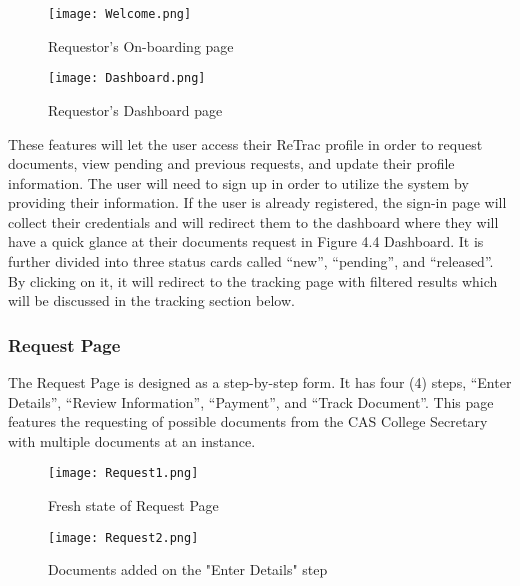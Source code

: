     \begin{figure}[h]
        \centering 
        \begin{minipage}[c]{0.5\linewidth}
            \centering
            \texttt{[image: Welcome.png]}
            \caption{Requestor's On-boarding page}
            \label{fig:Welcome}
        \end{minipage}\hfill
        \begin{minipage}[c]{0.5\linewidth}
            \centering
            \texttt{[image: Dashboard.png]}
            \caption{Requestor's Dashboard page}
            \label{fig:Dashboard}
        \end{minipage}
    \end{figure}


These features will let the user access their ReTrac profile in order to request documents, view pending and previous requests, and update their profile information. The user will need to sign up in order to utilize the system by providing their information. If the user is already registered, the sign-in page will collect their credentials and will redirect them to the dashboard where they will have a quick glance at their documents request in Figure 4.4 Dashboard. It is further divided into three status cards called “new”, “pending”, and “released”. By clicking on it, it will redirect to the tracking page with filtered results which will be discussed in the tracking section below.

\subsubsection{Request Page}

The Request Page is designed as a step-by-step form. It has four (4) steps, “Enter Details”, “Review Information”, “Payment”, and “Track Document”. This page features the requesting of possible documents from the CAS College Secretary with multiple documents at an instance.

    \begin{figure}[h]
        \centering 
        \begin{minipage}[c]{0.5\linewidth}
            \centering
            \texttt{[image: Request1.png]}
            \caption{Fresh state of Request Page}
            \label{fig:Request1}
        \end{minipage}\hfill
        \begin{minipage}[c]{0.5\linewidth}
            \centering
            \texttt{[image: Request2.png]}
            \caption{Documents added on the "Enter Details" step}
            \label{fig:Request2}
        \end{minipage}
    \end{figure}

